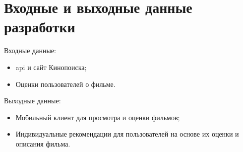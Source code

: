 \section{Входные и выходные данные разработки}

Входные данные:

\begin{itemize}
    \item api и сайт Кинопоиска;
    \item Оценки пользователей о фильме.
\end{itemize}

Выходные данные:

\begin{itemize}
    \item Мобильный клиент для просмотра и оценки фильмов;
    \item Индивидуальные рекомендации для пользователей на основе их оценки и описания фильма.
\end{itemize}